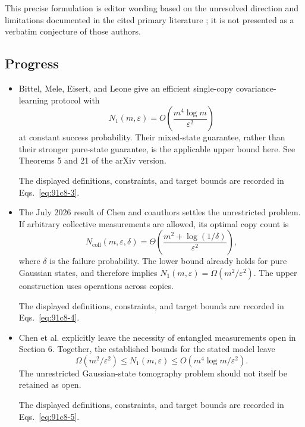 This precise formulation is editor wording based on the unresolved direction and limitations documented in the cited primary literature ; it is not presented as a verbatim conjecture of those authors.

\subsection*{Progress}

\begin{itemize}
  \item Bittel, Mele, Eisert, and Leone give an efficient single-copy covariance-learning protocol with
  \begin{equation}
N_1(m,\varepsilon)
  =O\!\left(\frac{m^4\log m}{\varepsilon^2}\right)
\label{eq:91c8-3}
\end{equation}
  at constant success probability. Their mixed-state guarantee, rather than their stronger pure-state guarantee, is the applicable upper bound here. See Theorems 5 and 21 of the arXiv version. 

The displayed definitions, constraints, and target bounds are recorded in Eqs.~\eqref{eq:91c8-3}.

  \item The July 2026 result of Chen and coauthors settles the unrestricted problem. If arbitrary collective measurements are allowed, its optimal copy count is
  \begin{equation}
N_{\mathrm{coll}}(m,\varepsilon,\delta)
  =\Theta\!\left(\frac{m^2+\log(1/\delta)}{\varepsilon^2}\right),
\label{eq:91c8-4}
\end{equation}
  where $\delta$ is the failure probability. The lower bound already holds for pure Gaussian states, and therefore implies $N_1(m,\varepsilon)=\Omega(m^2/\varepsilon^2)$. The upper construction uses operations across copies. 

The displayed definitions, constraints, and target bounds are recorded in Eqs.~\eqref{eq:91c8-4}.

  \item Chen et al. explicitly leave the necessity of entangled measurements open in Section 6. Together, the established bounds for the stated model leave
  \begin{equation}
\Omega(m^2/\varepsilon^2)
  \leq N_1(m,\varepsilon)
  \leq O(m^4\log m/\varepsilon^2).
\label{eq:91c8-5}
\end{equation}
  The unrestricted Gaussian-state tomography problem should not itself be retained as open. 

The displayed definitions, constraints, and target bounds are recorded in Eqs.~\eqref{eq:91c8-5}.
\end{itemize}

